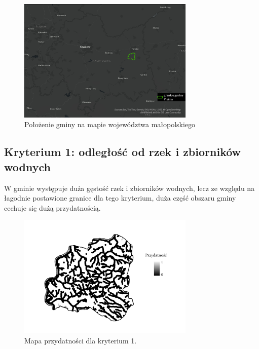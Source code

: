 \documentclass{article}
\begin{document}
\begin{figure}[H]
    \centering
    \includegraphics[width=0.75\textwidth]{img/plesna-polozenie.jpg}
    \caption{Położenie gminy na mapie województwa małopolskiego}
\end{figure}

\subsection{Kryterium 1: odległość od rzek i zbiorników wodnych}
W gminie występuje duża gęstość rzek i zbiorników wodnych, lecz ze względu na łagodnie postawione granice dla tego kryterium, duża część obszaru gminy cechuje się dużą przydatnością.

\begin{figure}[H]
    \centering
    \includegraphics[width=0.75\textwidth]{img/plesna-kryterium1-layout.jpg}
    \caption{Mapa przydatności dla kryterium 1.}
\end{figure}
\end{document}
